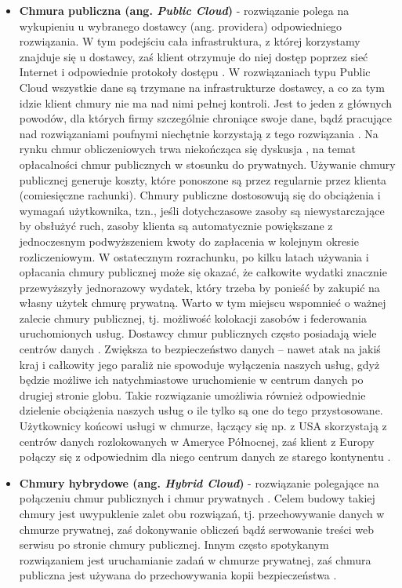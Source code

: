 \documentclass[10pt,a4paper,titlepage,twoside]{report}
\begin{document}
\begin{itemize}
	\item \textbf{Chmura publiczna (ang. \textit{Public Cloud})} - rozwiązanie polega na wykupieniu u wybranego dostawcy (ang. providera) odpowiedniego rozwiązania. W tym podejściu cała infrastruktura, z której korzystamy znajduje się u dostawcy, zaś klient otrzymuje do niej dostęp poprzez sieć Internet i odpowiednie protokoły dostępu \cite{ad12}. W rozwiązaniach typu Public Cloud wszystkie dane są trzymane na infrastrukturze dostawcy, a co za tym idzie klient chmury nie ma nad nimi pełnej kontroli. Jest to jeden z głównych powodów, dla których firmy szczególnie chroniące swoje dane, bądź pracujące nad rozwiązaniami poufnymi niechętnie korzystają z tego rozwiązania \cite{ad11}. Na rynku chmur obliczeniowych trwa niekończąca się dyskusja \cite{ad13}, na temat opłacalności chmur publicznych w stosunku do prywatnych. Używanie chmury publicznej generuje koszty, które ponoszone są przez regularnie przez klienta (comiesięczne rachunki). Chmury publiczne dostosowują się do obciążenia i wymagań użytkownika, tzn., jeśli dotychczasowe zasoby są niewystarczające by obsłużyć ruch, zasoby klienta są automatycznie powiększane z jednoczesnym podwyższeniem kwoty do zapłacenia w kolejnym okresie rozliczeniowym. W ostatecznym rozrachunku, po kilku latach używania i opłacania chmury publicznej może się okazać, że całkowite wydatki znacznie przewyższyły jednorazowy wydatek, który trzeba by ponieść by zakupić na własny użytek chmurę prywatną. Warto w tym miejscu wspomnieć o ważnej zalecie chmury publicznej, tj. możliwość kolokacji zasobów i federowania uruchomionych usług. Dostawcy chmur publicznych często posiadają wiele centrów danych \cite{ad11}. Zwiększa to bezpieczeństwo danych – nawet atak na jakiś kraj i całkowity jego paraliż nie spowoduje wyłączenia naszych usług, gdyż będzie możliwe ich natychmiastowe uruchomienie w centrum danych po drugiej stronie globu. Takie rozwiązanie umożliwia również odpowiednie dzielenie obciążenia naszych usług o ile tylko są one do tego przystosowane. Użytkownicy końcowi usługi w chmurze, łączący się np. z USA skorzystają z centrów danych rozlokowanych w Ameryce Północnej, zaś klient z Europy połączy się z odpowiednim dla niego centrum danych ze starego kontynentu \cite{ad11}.
	\item \textbf{Chmury hybrydowe (ang. \textit{Hybrid Cloud})} - rozwiązanie polegające na połączeniu chmur publicznych i chmur prywatnych \cite{ad13}. Celem budowy takiej chmury jest uwypuklenie zalet obu rozwiązań, tj. przechowywanie danych w chmurze prywatnej, zaś dokonywanie obliczeń bądź serwowanie treści web serwisu po stronie chmury publicznej. Innym często spotykanym rozwiązaniem jest uruchamianie zadań w chmurze prywatnej, zaś chmura publiczna jest używana do przechowywania kopii bezpieczeństwa \cite{ad13}.
\end{itemize}
\end{document}
